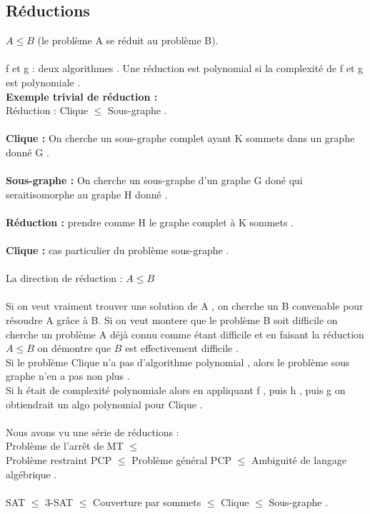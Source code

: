 \documentclass[base.tex]{subfiles}
\begin{document}
\subsection{Réductions}
$A\leq B $ (le problème A se réduit au problème B).\\
\\
f et g : deux algorithmes . Une réduction est polynomial si la complexité de f et g est polynomiale .\\
\textbf{Exemple trivial de réduction :}\\
Réduction : Clique $\leq$ Sous-graphe .\\
\\
\textbf{Clique : } On cherche un sous-graphe complet ayant K sommets dans un graphe donné G .\\
\\
\textbf{Sous-graphe : }On cherche un sous-graphe d'un graphe G doné qui seraitisomorphe au graphe H donné .\\
\\
\textbf{Réduction : }prendre comme H le graphe complet à K sommets .\\
\\
\textbf{Clique : }cas particulier du problème sous-graphe .\\
\\
La direction de réduction : $A\leq B$\\
\\
Si on veut vraiment trouver une solution de A , on cherche un B convenable pour résoudre A grâce à B. Si on veut montere que le problème B soit difficile on cherche un problème A déjà connu comme étant difficile et en faisant la réduction $A\leq B$ on démontre que $B$ est effectivement difficile .\\
Si le problème Clique n'a pas d'algorithme polynomial , alors le problème sous graphe n'en a pas non plus . \\
Si h était de complexité polynomiale alors en appliquant f , puis h , puis g on obtiendrait un algo polynomial pour Clique .\\
\\
Nous avons vu une série de réductions : \\
Problème de l'arrêt de MT $\leq$\\
Problème restraint PCP $\leq$ Problème général PCP $\leq$ Ambiguité de langage algébrique .\\
\\
SAT $\leq$ 3-SAT $\leq$ Couverture par sommets $\leq$ Clique $\leq$ Sous-graphe .\\
\end{document}
